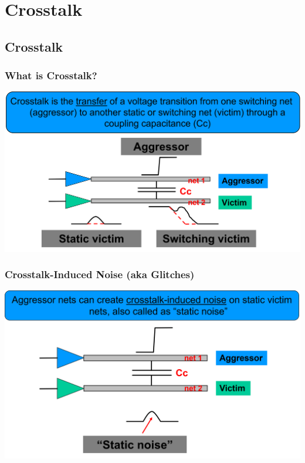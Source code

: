 \documentclass[compress]{beamer}
\begin{document}
\section[Crosstalk]{Crosstalk}
\subsection[Crosstalk]{Crosstalk}
\begin{frame}
	\frametitle{What is Crosstalk?}
	\begin{center}
		\includegraphics[width=\textwidth]{Crosstalk}
	\end{center}
\end{frame}


\begin{frame}
	\frametitle{Crosstalk-Induced Noise (aka Glitches)}
	\begin{center}
		\includegraphics[width=\textwidth]{Glitches}
	\end{center}
\end{frame}
\end{document}
